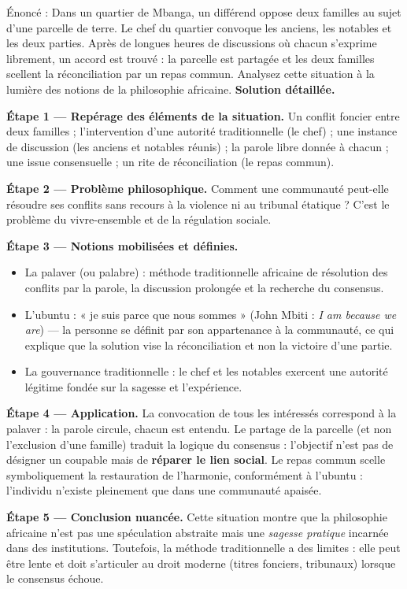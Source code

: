 \documentclass[11pt]{article}
\newcommand{\cle}[1]{{\popxbold\color{popdark}#1}}
\begin{document}
\begin{exoresolu}
Énoncé : Dans un quartier de Mbanga, un différend oppose deux familles au sujet d'une parcelle de terre. Le chef du quartier convoque les anciens, les notables et les deux parties. Après de longues heures de discussions où chacun s'exprime librement, un accord est trouvé : la parcelle est partagée et les deux familles scellent la réconciliation par un repas commun. Analysez cette situation à la lumière des notions de la philosophie africaine.
\tcblower
\textbf{Solution détaillée.}

\textbf{Étape 1 — Repérage des éléments de la situation.} Un conflit foncier entre deux familles ; l'intervention d'une autorité traditionnelle (le chef) ; une instance de discussion (les anciens et notables réunis) ; la parole libre donnée à chacun ; une issue consensuelle ; un rite de réconciliation (le repas commun).

\textbf{Étape 2 — Problème philosophique.} Comment une communauté peut-elle résoudre ses conflits sans recours à la violence ni au tribunal étatique ? C'est le problème du \cle{vivre-ensemble} et de la régulation sociale.

\textbf{Étape 3 — Notions mobilisées et définies.}
\begin{itemize}
\item La \cle{palaver} (ou palabre) : méthode traditionnelle africaine de résolution des conflits par la parole, la discussion prolongée et la recherche du consensus.
\item L'\cle{ubuntu} : « je suis parce que nous sommes » (John Mbiti : \emph{I am because we are}) — la personne se définit par son appartenance à la communauté, ce qui explique que la solution vise la réconciliation et non la victoire d'une partie.
\item La \cle{gouvernance traditionnelle} : le chef et les notables exercent une autorité légitime fondée sur la sagesse et l'expérience.
\end{itemize}

\textbf{Étape 4 — Application.} La convocation de tous les intéressés correspond à la palaver : la parole circule, chacun est entendu. Le partage de la parcelle (et non l'exclusion d'une famille) traduit la logique du consensus : l'objectif n'est pas de désigner un coupable mais de \textbf{réparer le lien social}. Le repas commun scelle symboliquement la restauration de l'harmonie, conformément à l'ubuntu : l'individu n'existe pleinement que dans une communauté apaisée.

\textbf{Étape 5 — Conclusion nuancée.} Cette situation montre que la philosophie africaine n'est pas une spéculation abstraite mais une \emph{sagesse pratique} incarnée dans des institutions. Toutefois, la méthode traditionnelle a des limites : elle peut être lente et doit s'articuler au droit moderne (titres fonciers, tribunaux) lorsque le consensus échoue.
\end{exoresolu}
\end{document}
